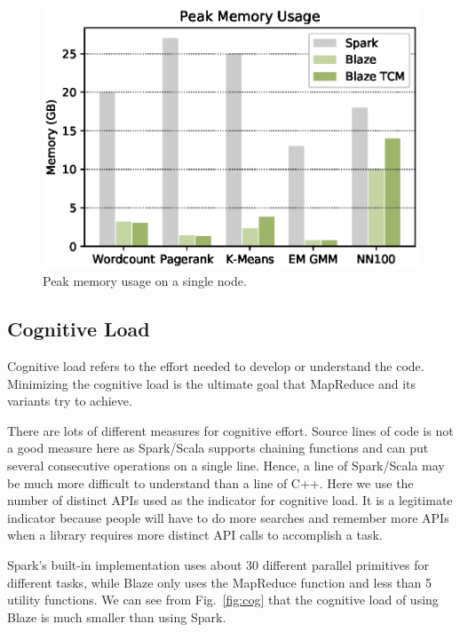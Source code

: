 \begin{figure}
  \begin{center}
  \includegraphics[width=0.7\linewidth]{figs/memory.eps}
  \end{center}
  \vspace{-0.5cm}
  \caption{Peak memory usage on a single node.
  }
  \label{fig:mem}
\end{figure}

\subsection{Cognitive Load}

Cognitive load refers to the effort needed to develop or understand the code.
Minimizing the cognitive load is the ultimate goal that MapReduce and its variants try to achieve.

There are lots of different measures for cognitive effort.
Source lines of code is not a good measure here as Spark/Scala supports chaining functions and can put several consecutive operations on a single line.
Hence, a line of Spark/Scala may be much more difficult to understand than a line of C++.
Here we use the number of distinct APIs used as the indicator for cognitive load.
It is a legitimate indicator because people will have to do more searches and remember more APIs when a library requires more distinct API calls to accomplish a task.

Spark's built-in implementation uses about 30 different parallel primitives for different tasks, while Blaze only uses the MapReduce function and less than 5 utility functions.
We can see from Fig.~\ref{fig:cog} that the cognitive load of using Blaze is much smaller than using Spark.

